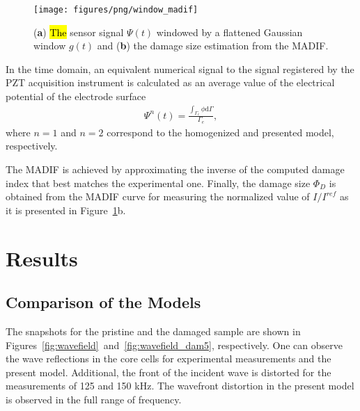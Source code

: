 \documentclass[sensors,article,accept,moreauthors,pdftex]{Definitions/mdpi}
\begin{document}
\begin{paracol}{2}
\vspace{-6pt}
\begin{figure}[H]
		\texttt{[image: figures/png/window\_madif]}
	\caption{(\textbf{a}) \hl{The} %
 sensor signal \(\Psi(t)\) windowed by a flattened Gaussian window \(g(t)\) and (\textbf{b}) the damage size estimation from the MADIF.}
	\label{fig:window_madif}
\end{figure}
In the time domain, an equivalent numerical signal to the signal registered by the PZT acquisition instrument is calculated as an average value of the electrical potential of the electrode surface
\begin{eqnarray}
	\Psi^{n}(t) = \frac{\int_{\Gamma_e}\phi\mathrm{d}\Gamma}{\Gamma_e},
	\label{eq:psi}
\end{eqnarray}
where \(n=1\) and \(n=2\) correspond to the homogenized and presented model, respectively.

The MADIF is achieved by approximating the inverse of the computed damage index that best matches the experimental one.
Finally, the damage size \(\Phi_D\) is obtained from the MADIF curve for measuring the normalized value of \(I/I^{ref}\) as it is presented in Figure~\ref{fig:window_madif}b.
\section{Results}
\label{sec:results}
\subsection{Comparison of the Models}
\label{comparison}
The snapshots for the pristine and the damaged sample are shown in \mbox{Figures~\ref{fig:wavefield} and \ref{fig:wavefield_dam5}}, respectively.
One can observe the wave reflections in the core cells for experimental measurements and the present model. 
Additional, the front of the incident wave is distorted for the measurements of 125 and 150 kHz.
The wavefront distortion in the present model is observed in the full range of frequency. 


\end{paracol}
\end{document}
